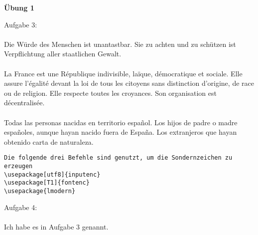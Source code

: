 \documentclass{article}
\begin{document}
\begin{center}
\textbf {Übung 1}
\end{center}
Aufgabe 3:\\
\\
Die Würde des Menschen ist unantastbar. Sie zu achten und zu schützen ist Verpflichtung aller staatlichen Gewalt.\\
\\
La France est une République indivisible, laïque, démocratique et sociale. Elle assure l’égalité devant la loi de tous les citoyens sans distinction d’origine, de race ou de religion. Elle respecte toutes les croyances. Son organisation est décentralisée.\\
\\
Todas las personas nacidas en territorio español. Los hijos de padre o madre españoles, aunque hayan nacido fuera de España. Los extranjeros que hayan obtenido carta de naturaleza.

\begin{verbatim}
Die folgende drei Befehle sind genutzt, um die Sondernzeichen zu erzeugen
\usepackage[utf8]{inputenc}
\usepackage[T1]{fontenc}
\usepackage{lmodern}

\end{verbatim}

Aufgabe 4:\\
\\
Ich habe es in Aufgabe 3 genannt.
\end{document}

